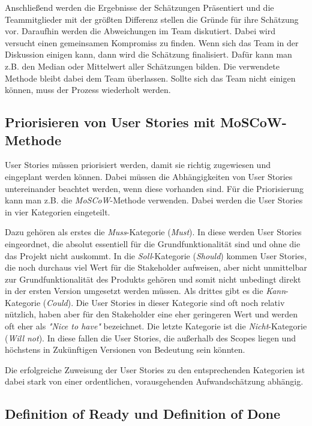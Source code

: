 \documentclass[acmtog]{acmart}
\begin{document}
Anschließend werden die Ergebnisse der Schätzungen Präsentiert und die Teammitglieder mit der größten Differenz stellen die Gründe für ihre Schätzung vor.
Daraufhin werden die Abweichungen im Team diskutiert. Dabei wird versucht einen gemeinsamen Kompromiss zu finden. Wenn sich das Team in der Diskussion einigen kann, dann wird die Schätzung finalisiert.
Dafür kann man z.B. den Median oder Mittelwert aller Schätzungen bilden. Die verwendete Methode bleibt dabei dem Team überlassen. Sollte sich das Team nicht einigen können, muss der Prozess wiederholt werden. \cite{planingpoker}

\subsection{Priorisieren von User Stories mit MoSCoW-Methode} \label{sec:priorization}

User Stories müssen priorisiert werden, damit sie richtig zugewiesen und eingeplant werden können. Dabei müssen die Abhängigkeiten von User Stories untereinander
beachtet werden, wenn diese vorhanden sind. Für die Priorisierung kann man z.B. die \emph{MoSCoW}-Methode verwenden. Dabei werden die User Stories in vier Kategorien eingeteilt. \cite{moscow}

Dazu gehören als erstes die \emph{Muss}-Kategorie (\emph{Must}). In diese werden User Stories eingeordnet, die absolut essentiell für die Grundfunktionalität sind und ohne die das
Projekt nicht auskommt. In die \emph{Soll}-Kategorie (\emph{Should}) kommen User Stories, die noch durchaus viel Wert für die Stakeholder aufweisen, aber nicht unmittelbar zur Grundfunktionalität
des Produkts gehören und somit nicht unbedingt direkt in der ersten Version umgesetzt werden müssen. Als drittes gibt es die \emph{Kann}-Kategorie (\emph{Could}). Die User Stories in dieser Kategorie sind oft
noch relativ nützlich, haben aber für den Stakeholder eine eher geringeren Wert und werden oft eher als \emph{"Nice to have"} bezeichnet. Die letzte Kategorie ist die \emph{Nicht}-Kategorie
(\emph{Will not}). In diese fallen die User Stories, die außerhalb des Scopes liegen und höchstens in Zukünftigen Versionen von Bedeutung sein könnten. \cite{moscow}

Die erfolgreiche Zuweisung der User Stories zu den entsprechenden Kategorien ist dabei stark von einer ordentlichen, vorausgehenden Aufwandschätzung abhängig. \cite{moscow}


\subsection{Definition of Ready und Definition of Done}
\end{document}
